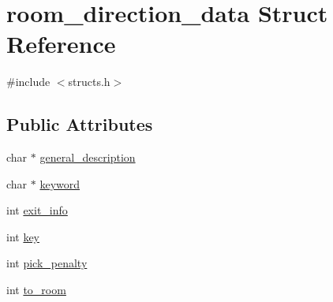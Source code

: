 \hypertarget{structroom__direction__data}{\section{room\-\_\-direction\-\_\-data Struct Reference}
\label{structroom__direction__data}
}


{\ttfamily \#include $<$structs.\-h$>$}

\subsection*{Public Attributes}
\begin{DoxyCompactItemize}
\item 
char $\ast$ \hyperlink{structroom__direction__data_a1ade427d564a7a8f6777187eabd8bb33}{general\-\_\-description}
\item 
char $\ast$ \hyperlink{structroom__direction__data_a474e18e08063ab1ceee6515055dd1bc6}{keyword}
\item 
int \hyperlink{structroom__direction__data_ad4e0b315a7b257e243a46493c820e690}{exit\-\_\-info}
\item 
int \hyperlink{structroom__direction__data_a7dbbe646bb08df5182a5c0e9f0d9f96a}{key}
\item 
int \hyperlink{structroom__direction__data_a27858fd25c97d5ebb67c6381b0dcd4b6}{pick\-\_\-penalty}
\item 
int \hyperlink{structroom__direction__data_a579f4d62f8f19916d36630ceccdceb1e}{to\-\_\-room}
\end{DoxyCompactItemize}


